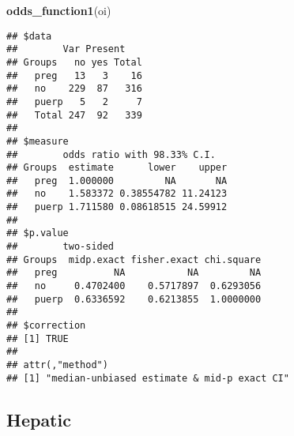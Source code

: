 \documentclass[
]{article}
\newenvironment{Shaded}{\begin{snugshade}}{\end{snugshade}}
\newcommand{\DataTypeTok}[1]{\textcolor[rgb]{0.13,0.29,0.53}{#1}}
\newcommand{\KeywordTok}[1]{\textcolor[rgb]{0.13,0.29,0.53}{\textbf{#1}}}
\newcommand{\NormalTok}[1]{#1}
\newcommand{\OperatorTok}[1]{\textcolor[rgb]{0.81,0.36,0.00}{\textbf{#1}}}
\newcommand{\OtherTok}[1]{\textcolor[rgb]{0.56,0.35,0.01}{#1}}
\newcommand{\StringTok}[1]{\textcolor[rgb]{0.31,0.60,0.02}{#1}}
\begin{document}
\begin{Shaded}
\begin{Highlighting}[]
\KeywordTok{odds_function1}\NormalTok{(oi)}
\end{Highlighting}
\end{Shaded}

\begin{verbatim}
## $data
##        Var Present
## Groups   no yes Total
##   preg   13   3    16
##   no    229  87   316
##   puerp   5   2     7
##   Total 247  92   339
## 
## $measure
##        odds ratio with 98.33% C.I.
## Groups  estimate      lower    upper
##   preg  1.000000         NA       NA
##   no    1.583372 0.38554782 11.24123
##   puerp 1.711580 0.08618515 24.59912
## 
## $p.value
##        two-sided
## Groups  midp.exact fisher.exact chi.square
##   preg          NA           NA         NA
##   no     0.4702400    0.5717897  0.6293056
##   puerp  0.6336592    0.6213855  1.0000000
## 
## $correction
## [1] TRUE
## 
## attr(,"method")
## [1] "median-unbiased estimate & mid-p exact CI"
\end{verbatim}

\hypertarget{hepatic}{%
\subsection{Hepatic}\label{hepatic}}

\begin{Shaded}
\end{Shaded}

\begin{Shaded}
\end{Shaded}
\end{document}
